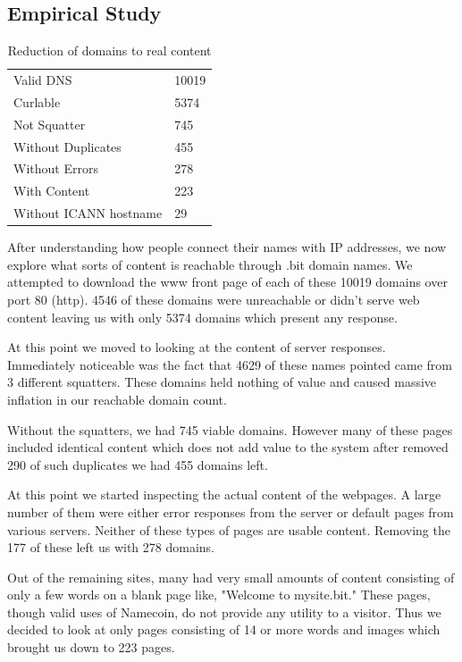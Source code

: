\subsection{Empirical Study}
\label{domainbreakdown}

\begin{table}[t]
\begin{tabular}{ll}
Valid DNS          &  10019  \\
Curlable        & 5374     \\
Not Squatter        & 745     \\
Without Duplicates      & 455     \\
Without Errors              & 278    \\
With Content              & 223    \\
Without ICANN hostname   & 29   \\
\end{tabular}
\caption{Reduction of domains to real content}
\end{table}

After understanding how people connect their names with IP addresses, we now explore what sorts of content is reachable through .bit domain names. We attempted to download the www front page of each of these 10019 domains over port 80 (http). 4546 of these domains were unreachable or didn't serve web content leaving us with only 5374 domains which present any response.

At this point we moved to looking at the content of server responses. Immediately noticeable was the fact that 4629 of these names pointed came from 3 different squatters. These domains held nothing of value and caused massive inflation in our reachable domain count.

Without the squatters, we had 745 viable domains. However many of these pages included identical content which does not add value to the system after removed 290 of such duplicates we had 455 domains left.

At this point we started inspecting the actual content of the webpages. A large number of them were either error responses from the server or default pages from various servers. Neither of these types of pages are usable content. Removing the 177 of these left us with 278 domains.

Out of the remaining sites, many had very small amounts of content consisting of only a few words on a blank page like, "Welcome to mysite.bit." These pages, though valid uses of Namecoin, do not provide any utility to a visitor. Thus we decided to look at only pages consisting of 14 or more words and images which brought us down to 223 pages.

